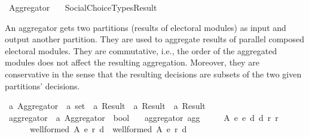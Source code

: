 %
\begin{isabellebody}%
%
%
\isadelimdocument
\isanewline
%
\endisadelimdocument
%
\isatagdocument
\isanewline
\isanewline
\isanewline
%
\isamarkuptrue%
%
\endisatagdocument
{\isafolddocument}%
%
\isadelimdocument
%
\endisadelimdocument
%
\isadelimtheory
%
\endisadelimtheory
%
\isatagtheory
{}\isamarkupfalse%
\ Aggregator\isanewline
\ \ \ {\isachardoublequoteopen}{\isachardot}{\kern0pt}{\isachardot}{\kern0pt}{\isacharslash}{\kern0pt}{\isachardot}{\kern0pt}{\isachardot}{\kern0pt}{\isacharslash}{\kern0pt}Social{\isacharunderscore}{\kern0pt}Choice{\isacharunderscore}{\kern0pt}Types{\isacharslash}{\kern0pt}Result{\isachardoublequoteclose}\isanewline
{}%
\endisatagtheory
{\isafoldtheory}%
%
\isadelimtheory
%
\endisadelimtheory
%
\begin{isamarkuptext}%
An aggregator gets two partitions (results of electoral modules) as input and
output another partition. They are used to aggregate results of parallel
composed electoral modules.
They are commutative, i.e., the order of the aggregated modules does not affect
the resulting aggregation. Moreover, they are conservative in the sense that
the resulting decisions are subsets of the two given partitions' decisions.%
\end{isamarkuptext}\isamarkuptrue%
%
\isadelimdocument
%
\endisadelimdocument
%
\isatagdocument
%
\isamarkuptrue%
%
\endisatagdocument
{\isafolddocument}%
%
\isadelimdocument
%
\endisadelimdocument
{}\isamarkupfalse%
\ {\isacharprime}{\kern0pt}a\ Aggregator\ {\isacharequal}{\kern0pt}\ {\isachardoublequoteopen}{\isacharprime}{\kern0pt}a\ set\ {\isasymRightarrow}\ {\isacharprime}{\kern0pt}a\ Result\ {\isasymRightarrow}\ {\isacharprime}{\kern0pt}a\ Result\ {\isasymRightarrow}\ {\isacharprime}{\kern0pt}a\ Result{\isachardoublequoteclose}\isanewline
\isanewline
{}\isamarkupfalse%
\ aggregator\ {\isacharcolon}{\kern0pt}{\isacharcolon}{\kern0pt}\ {\isachardoublequoteopen}{\isacharprime}{\kern0pt}a\ Aggregator\ {\isasymRightarrow}\ bool{\isachardoublequoteclose}\ \isanewline
\ \ {\isachardoublequoteopen}aggregator\ agg\ {\isasymequiv}\isanewline
\ \ \ \ {\isasymforall}A\ e{}\ e{}\ d{}\ d{}\ r{}\ r{}{\isachardot}{\kern0pt}\isanewline
\ \ \ \ \ \ {\isacharparenleft}{\kern0pt}well{\isacharunderscore}{\kern0pt}formed\ A\ {\isacharparenleft}{\kern0pt}e{}{\isacharcomma}{\kern0pt}\ r{}{\isacharcomma}{\kern0pt}\ d{}{\isacharparenright}{\kern0pt}\ {\isasymand}\ well{\isacharunderscore}{\kern0pt}formed\ A\ {\isacharparenleft}{\kern0pt}e{}{\isacharcomma}{\kern0pt}\ r{}{\isacharcomma}{\kern0pt}\ d{}{\isacharparenright}{\kern0pt}{\isacharparenright}{\kern0pt}\ {\isasymlongrightarrow}\isanewline

\end{isabellebody}
